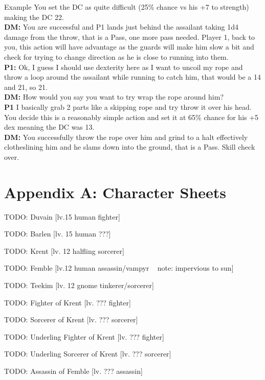 \documentclass[10pt,twoside,twocolumn]{article}
\begin{document}
\begin{paperbox}{Example}
You set the DC as quite difficult (25\% chance vs his +7 to strength) making the DC 22.\\

\textbf{DM:} You are successful and P1 lands just behind the assailant taking 1d4 damage from the throw, that is a Pass, one more pass needed. Player 1, back to you, this action will have advantage as the guards will make him slow a bit and check for trying to change direction as he is close to running into them.\\
\textbf{P1:} Ok, I guess I should use dexterity here as I want to uncoil my rope and throw a loop around the assailant while running to catch him, that would be a 14 and 21, so 21.\\
\textbf{DM:} How would you say you want to try wrap the rope around him?\\
\textbf{P1} I basically grab 2 parts like a skipping rope and try throw it over his head.\\

You decide this is a reasonably simple action and set it at 65\% chance for his +5 dex meaning the DC was 13.\\

\textbf{DM:} You successfully throw the rope over him and grind to a halt effectively clotheslining him and he slams down into the ground, that is a Pass. Skill check over.\\

\end{paperbox}

\section{Appendix A: Character Sheets}
TODO: Duvain [lv.15 human fighter]

TODO: Barlen [lv. 15 human ???]

TODO: Krent [lv. 12 halfling sorcerer]

TODO: Femble [lv.12 human assassin/vampyr ~ note: impervious to sun]

TODO: Teekim [lv. 12 gnome tinkerer/sorcerer]

TODO: Fighter of Krent [lv. ??? fighter]

TODO: Sorcerer of Krent [lv. ??? sorcerer]

TODO: Underling Fighter of Krent [lv. ??? fighter]

TODO: Underling Sorcerer of Krent [lv. ??? sorcerer]

TODO: Assassin of Femble [lv. ??? assassin]
\end{document}
